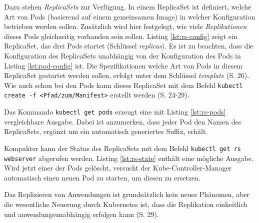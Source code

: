 \documentclass[11pt,a4paper]{article}
\begin{document}
Dazu stehen \emph{ReplicaSets} zur Verfügung.
In einem ReplicaSet ist definiert, welche Art von Pods (basierend auf einem gemeinsamen Image)
in welcher Konfiguration betrieben werden sollen. Zusätzlich wird hier festgelegt, wie viele \emph{Replikationen}
dieses Pods gleichzeitig vorhanden sein sollen.
Listing \ref{lst:rs-config} zeigt ein ReplicaSet, das drei Pods startet (Schlüssel \emph{replicas}).
Es ist zu beachten, dass die Konfiguration des ReplicaSets unabhängig von der Konfiguration
des Pods in Listing \ref{lst:pod-config} ist.
Die Spezifikationen welche Art von Pods in diesem ReplicaSet gestartet werden sollen,
erfolgt unter dem Schlüssel \emph{template} \cite{Schmeling_Dargatz_2022} (S. 26).
Wie auch schon bei den Pods kann dieses ReplicaSet mit dem Befehl
\lstinline|kubectl create -f <Pfad/zum/Manifest>| erstellt werden \cite{Schmeling_Dargatz_2022} (S. 24-29).

% 

Das Kommando \lstinline|kubectl get pods| erzeugt eine mit Listing \ref{lst:rs-pods}
vergleichbare Ausgabe. Dabei ist anzumerken, dass jeder Pod den Namen des ReplicaSets,
ergänzt um ein automatisch generiertes Suffix, erhält.


Kompakter kann der Status des ReplicaSets mit dem Befehl \lstinline|kubectl get rs webserver|
abgerufen werden. Listing \ref{lst:rs-state} enthält eine mögliche Ausgabe.
Wird jetzt einer der Pods gelöscht, versucht der Kube-Controller-Manager automatisch
einen neuen Pod zu starten, um diesen zu ersetzen.

Das Replizieren von Anwendungen ist grundsätzlich kein neues Phänomen, aber
die wesentliche Neuerung durch Kubernetes ist, dass die Replikation einheitlich
und anwendungsunabhängig erfolgen kann \cite{Schmeling_Dargatz_2022} (S. 29).

\end{document}
